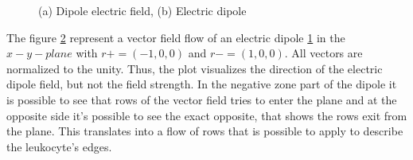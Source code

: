 \begin{figure}
\begin{subfigure}[b]{0.5\textwidth}
		\caption{ }
		\label{fig:dipole}
	\end{subfigure}
	\caption{(a) Dipole electric field, (b) Electric dipole}
	\label{fig:fielddipole}
\end{figure}
The figure \ref{fig:fielddipole} represent a vector field flow of an electric dipole \ref{fig:dipole} in the $x-y-plane$ with $r+=(-1,0,0) $ and $ r-=(1,0,0)$. All vectors are normalized to the unity. Thus, the plot visualizes the direction of the electric dipole field, but not the field strength. In the negative zone part of the dipole it is possible to see that rows of the vector field tries to enter the plane and at the opposite side it’s possible to see the exact opposite, that shows the rows exit from the plane. This translates into a flow of rows that is possible to apply to describe the leukocyte's edges.

\bigskip



